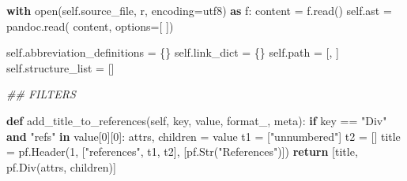 \documentclass[
]{article}
\newenvironment{Shaded}{}{}
\newcommand{\BuiltInTok}[1]{\textcolor[rgb]{0.00,0.50,0.00}{#1}}
\newcommand{\CommentTok}[1]{\textcolor[rgb]{0.38,0.63,0.69}{\textit{#1}}}
\newcommand{\ControlFlowTok}[1]{\textcolor[rgb]{0.00,0.44,0.13}{\textbf{#1}}}
\newcommand{\DecValTok}[1]{\textcolor[rgb]{0.25,0.63,0.44}{#1}}
\newcommand{\ImportTok}[1]{\textcolor[rgb]{0.00,0.50,0.00}{\textbf{#1}}}
\newcommand{\KeywordTok}[1]{\textcolor[rgb]{0.00,0.44,0.13}{\textbf{#1}}}
\newcommand{\NormalTok}[1]{#1}
\newcommand{\OperatorTok}[1]{\textcolor[rgb]{0.40,0.40,0.40}{#1}}
\newcommand{\StringTok}[1]{\textcolor[rgb]{0.25,0.44,0.63}{#1}}
\newcommand{\VariableTok}[1]{\textcolor[rgb]{0.10,0.09,0.49}{#1}}
\begin{document}
\begin{Shaded}
\begin{Highlighting}[numbers=left,,firstnumber=100,]
        \ControlFlowTok{with} \BuiltInTok{open}\NormalTok{(}\VariableTok{self}\NormalTok{.source\_file, }\StringTok{\textquotesingle{}r\textquotesingle{}}\NormalTok{, encoding}\OperatorTok{=}\StringTok{\textquotesingle{}utf8\textquotesingle{}}\NormalTok{) }\ImportTok{as}\NormalTok{ f:}
\NormalTok{            content }\OperatorTok{=}\NormalTok{ f.read()}
        \VariableTok{self}\NormalTok{.ast }\OperatorTok{=}\NormalTok{ pandoc.read(}
\NormalTok{            content,}
\NormalTok{            options}\OperatorTok{=}\NormalTok{[}
\NormalTok{            ])}

        \VariableTok{self}\NormalTok{.abbreviation\_definitions }\OperatorTok{=}\NormalTok{ \{\}}
        \VariableTok{self}\NormalTok{.link\_dict }\OperatorTok{=}\NormalTok{ \{\}}
        \VariableTok{self}\NormalTok{.path }\OperatorTok{=}\NormalTok{ [}\StringTok{\textquotesingle{}\textquotesingle{}}\NormalTok{, }\StringTok{\textquotesingle{}\textquotesingle{}}\NormalTok{]}
        \VariableTok{self}\NormalTok{.structure\_list }\OperatorTok{=}\NormalTok{ []}

    \CommentTok{\#\# FILTERS}

    \KeywordTok{def}\NormalTok{ add\_title\_to\_references(}\VariableTok{self}\NormalTok{, key, value, format\_, meta):}
        \ControlFlowTok{if}\NormalTok{ key }\OperatorTok{==} \StringTok{"Div"} \KeywordTok{and} \StringTok{"refs"} \KeywordTok{in}\NormalTok{ value[}\DecValTok{0}\NormalTok{][}\DecValTok{0}\NormalTok{]:}
\NormalTok{            attrs, children }\OperatorTok{=}\NormalTok{ value}
\NormalTok{            t1 }\OperatorTok{=}\NormalTok{ [}\StringTok{"unnumbered"}\NormalTok{]}
\NormalTok{            t2 }\OperatorTok{=}\NormalTok{ []}
\NormalTok{            title }\OperatorTok{=}\NormalTok{ pf.Header(}\DecValTok{1}\NormalTok{, [}\StringTok{"references"}\NormalTok{, t1, t2], [pf.Str(}\StringTok{"References"}\NormalTok{)])}
            \ControlFlowTok{return}\NormalTok{ [title, pf.Div(attrs, children)]}
\end{Highlighting}
\end{Shaded}
\end{document}
